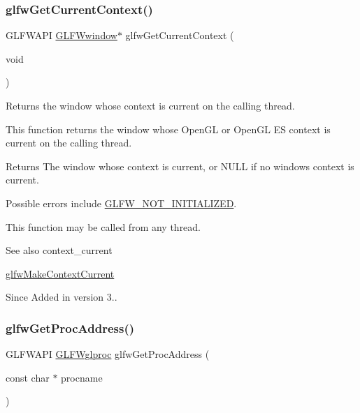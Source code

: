 \subsubsection{\texorpdfstring{glfw\+Get\+Current\+Context()}{glfwGetCurrentContext()}}
{\footnotesize\ttfamily G\+L\+F\+W\+A\+PI \hyperlink{group__window_ga3c96d80d363e67d13a41b5d1821f3242}{G\+L\+F\+Wwindow}$\ast$ glfw\+Get\+Current\+Context (\begin{DoxyParamCaption}\item[{void}]{ }\end{DoxyParamCaption})}



Returns the window whose context is current on the calling thread. 

This function returns the window whose Open\+GL or Open\+GL ES context is current on the calling thread.

\begin{DoxyReturn}{Returns}
The window whose context is current, or {\ttfamily N\+U\+LL} if no window\textquotesingle{}s context is current.
\end{DoxyReturn}
Possible errors include \hyperlink{group__errors_ga2374ee02c177f12e1fa76ff3ed15e14a}{G\+L\+F\+W\+\_\+\+N\+O\+T\+\_\+\+I\+N\+I\+T\+I\+A\+L\+I\+Z\+ED}.

This function may be called from any thread.

\begin{DoxySeeAlso}{See also}
context\+\_\+current 

\hyperlink{group__context_gafd76c93e15ec8b0b90506a9936a46185}{glfw\+Make\+Context\+Current}
\end{DoxySeeAlso}
\begin{DoxySince}{Since}
Added in version 3.. 
\end{DoxySince}
\mbox{\label{group__context_ga0e8af175218929615c16e74938c10f2a}} 
\subsubsection{\texorpdfstring{glfw\+Get\+Proc\+Address()}{glfwGetProcAddress()}}
{\footnotesize\ttfamily G\+L\+F\+W\+A\+PI \hyperlink{group__context_ga3d47c2d2fbe0be9c505d0e04e91a133c}{G\+L\+F\+Wglproc} glfw\+Get\+Proc\+Address (\begin{DoxyParamCaption}\item[{const char $\ast$}]{procname }\end{DoxyParamCaption})}



